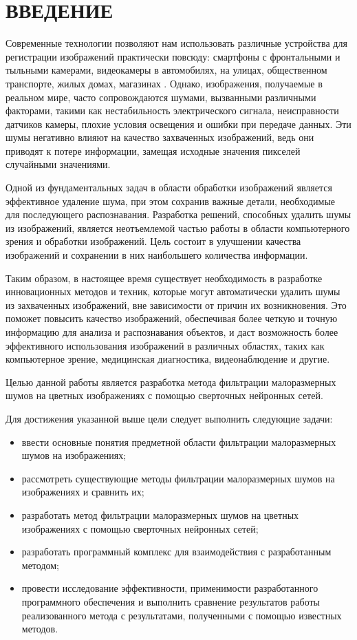 \chapter*{ВВЕДЕНИЕ}

Современные технологии позволяют нам использовать различные устройства для регистрации изображений практически повсюду: смартфоны с фронтальными и тыльными камерами, видеокамеры в автомобилях, на улицах, общественном транспорте, жилых домах, магазинах \cite{cameras}. Однако, изображения, получаемые в реальном мире, часто сопровождаются шумами, вызванными различными факторами, такими как нестабильность электрического сигнала, неисправности датчиков камеры, плохие условия освещения и ошибки при передаче данных. Эти шумы негативно влияют на качество захваченных изображений, ведь они приводят к потере информации, замещая исходные значения пикселей случайными значениями.

Одной из фундаментальных задач в области обработки изображений является эффективное удаление шума, при этом сохранив важные детали, необходимые для последующего распознавания. Разработка решений, способных удалить шумы из изображений, является неотъемлемой частью работы в области компьютерного зрения и обработки изображений. Цель состоит в улучшении качества изображений и сохранении в них наибольшего количества информации.

Таким образом, в настоящее время существует необходимость в разработке инновационных методов и техник, которые могут автоматически удалить шумы из захваченных изображений, вне зависимости от причин их возникновения. Это поможет повысить качество изображений, обеспечивая более четкую и точную информацию для анализа и распознавания объектов, и даст возможность более эффективного использования изображений в различных областях, таких как компьютерное зрение, медицинская диагностика, видеонаблюдение и другие.

Целью данной работы является разработка метода фильтрации малоразмерных шумов на цветных изображениях с помощью сверточных нейронных сетей.

Для достижения указанной выше цели следует выполнить следующие задачи:
	\begin{itemize}
		\item ввести основные понятия предметной области фильтрации малоразмерных шумов на изображениях;
		\item рассмотреть существующие методы фильтрации малоразмерных шумов на изображениях и сравнить их;
  	\item разработать метод фильтрации малоразмерных шумов на цветных изображениях с помощью сверточных нейронных сетей;
		\item разработать программный комплекс для взаимодействия с разработанным методом;
        \item провести исследование эффективности, применимости разработанного программного обеспечения и выполнить сравнение результатов работы реализованного метода с результатами, полученными с помощью известных методов.
	\end{itemize}
